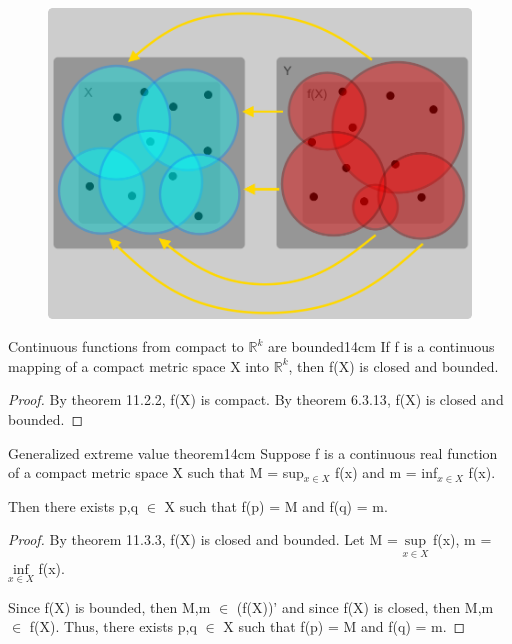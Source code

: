     \begin{figure}[h]
        \centering
        \includegraphics[scale=0.28]{Images/11.3.2.png}
    \end{figure}



    \begin{wtheorem}{Continuous functions from compact to
    $\mathbb{R}^k$ are bounded}{14cm}
        If f is a continuous mapping of a compact metric space X
        into $\mathbb{R}^k$, then f(X) is closed and bounded. 
    \end{wtheorem}

    \begin{proof}
        By {\color{red} theorem 11.2.2}, f(X) is compact.
        By {\color{red} theorem 6.3.13}, f(X) is closed and bounded.
    \end{proof}

    \vspace{0.5cm}



    \begin{wtheorem}{Generalized extreme value theorem}{14cm}
        Suppose f is a continuous real function of a compact metric space X
        such that M = sup$_{x \in X}$ f(x) and m = inf$_{x \in X}$ f(x).

        Then there exists p,q $\in$ X such that f(p) = M and f(q) = m.        
    \end{wtheorem}

    \begin{proof}
        By {\color{red} theorem 11.3.3}, f(X) is closed and bounded.
        Let M = $\underset{x \in X}{\text{sup}}$ f(x),
        m = $\underset{x \in X}{\text{inf}}$ f(x).

        Since f(X) is bounded, then M,m $\in$ (f(X))' and
        since f(X) is closed, then M,m $\in$ f(X).
        Thus, there exists p,q $\in$ X such that f(p) = M and f(q) = m.
    \end{proof}

